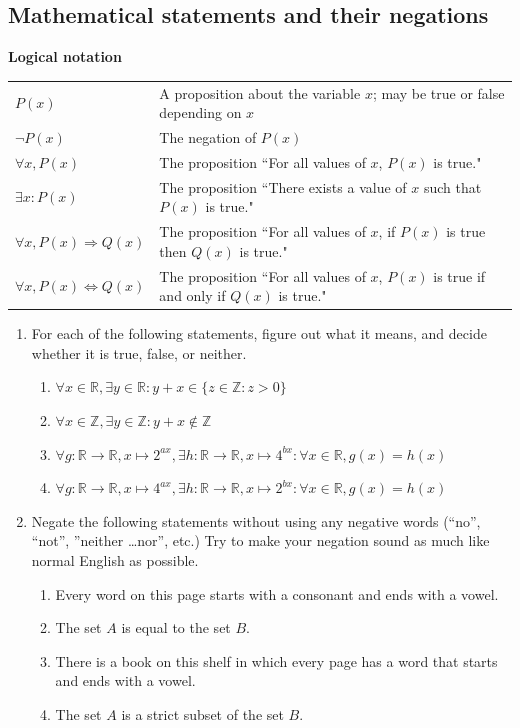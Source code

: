 \documentclass[11pt]{article}
\newenvironment{task}
	{\begin{mdframed}[linecolor=lightgray, linewidth=3pt]\raggedright}
	{\end{mdframed}}
\newcommand{\R}{\mathbb{R}}
\newcommand{\Z}{\mathbb{Z}}
\newcommand\st{:}
\theoremstyle{definition}
\begin{document}
\subsection{Mathematical statements and their negations}
\label{s: statements and negations}

{\bf Logical notation}

\begin{tabular}{L{1in}L{5in}}
$P(x)$ & A proposition about the variable $x$; may be true or false depending on $x$ \\

$\neg P(x)$ & The negation of $P(x)$ \\

$\forall x, P(x)$ & The proposition ``For all values of $x$, $P(x)$ is true." \\

$\exists x: P(x)$ & The proposition ``There exists a value of $x$ such that $P(x)$ is true." \\

$\forall x, P(x) \Rightarrow Q(x)$ & The proposition ``For all values of $x$, if $P(x)$ is true then $Q(x)$ is true."\\

$\forall x, P(x) \Leftrightarrow Q(x)$ & The proposition ``For all values of $x$, $P(x)$ is true if and only if $Q(x)$ is true." 
\end{tabular}

\begin{task}
\begin{enumerate}
\item For each of the following statements, figure out what it means, and decide whether it is true, false, or neither. 
	 \begin{enumerate}
	 \item $\forall x\in \R, \exists y\in \R \st y+x\in\{z\in \Z \st z > 0\}$
	  \item $\forall x\in \Z, \exists y\in \Z \st y+x\notin \Z$
	 \item$\forall g:\R\to\R, x\mapsto 2^{ax},  \exists h:\R\to\R, x\mapsto 4^{bx} \st \forall x\in \R, g(x)=h(x)$
	  \item$\forall g:\R\to\R, x\mapsto 4^{ax},  \exists h:\R\to\R, x\mapsto 2^{bx} \st \forall x\in \R, g(x)=h(x)$
	 \end{enumerate}
\item Negate the following statements without using any negative words (``no'', ``not'', ''neither \dots nor'', etc.) Try to make your negation sound as much like normal English as possible. 
	\begin{enumerate}
	\item Every word on this page starts with a consonant and ends with a vowel.
	\item The set $A$ is equal to the set $B$.
	\item There is a book on this shelf in which every page has a word that starts and ends with a vowel.
	\item The set $A$ is a strict subset of the set $B$.
	\end{enumerate}
\end{enumerate}
\end{task}
\end{document}
